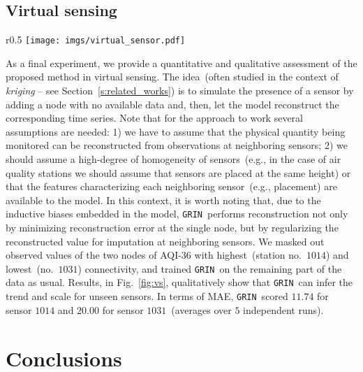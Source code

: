 \documentclass{article} \usepackage{iclr2022_conference,times}
\newcommand{\GRIL}{\texttt{GRIN}}
\begin{document}
\subsection{Virtual sensing}

\begin{wrapfigure}{r}{0.5\linewidth}
  \centering
\vspace{-0.75cm}
\texttt{[image: imgs/virtual\_sensor.pdf]}
\vspace{-1.cm}
\caption{Reconstruction of observations from sensors removed from the training set. Plots show that \GRIL\ might be used for virtual sensing.}
\label{fig:vs}
\end{wrapfigure}

As a final experiment, we provide a quantitative and qualitative assessment of the proposed method in virtual sensing. The idea~(often studied in the context of \textit{kriging} -- see Section~\ref{s:related_works}) is to simulate the presence of a sensor by adding a node with no available data and, then, let the model reconstruct the corresponding time series. Note that for the approach to work several assumptions are needed: 1) we have to assume that the physical quantity being monitored can be reconstructed from observations at neighboring sensors; 2) we should assume a high-degree of homogeneity of sensors~(e.g., in the case of air quality stations we should assume that sensors are placed at the same height) or that the features characterizing each neighboring sensor~(e.g., placement) are available to the model. In this context, it is worth noting that, due to the inductive biases embedded in the model, \GRIL\ performs reconstruction not only by minimizing reconstruction error at the single node, but by regularizing the reconstructed value for imputation at neighboring sensors. We masked out observed values of the two nodes of AQI-$36$ with highest~(station no.\ $1014$) and lowest~(no.\ $1031$) connectivity, and trained \GRIL\ on the remaining part of the data as usual. Results, in Fig.~\ref{fig:vs}, qualitatively show that \GRIL\ can infer the trend and scale for unseen sensors. In terms of MAE, \GRIL\ scored $11.74$ for sensor $1014$ and $20.00$ for sensor $1031$~(averages over $5$ independent runs).

\section{Conclusions}\label{s:conclusion}
\end{document}
